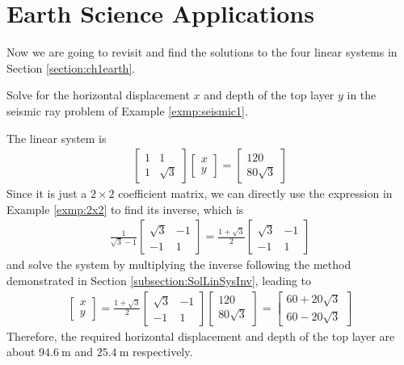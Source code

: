 \section{Earth Science Applications}
\label{section:ch3earth}
Now we are going to revisit and find the solutions to the four linear systems in Section \ref{section:ch1earth}.
\begin{exmp}
Solve for the horizontal displacement $x$ and depth of the top layer $y$ in the seismic ray problem of Example \ref{exmp:seismic1}.
\end{exmp}
\begin{solution}
The linear system is
\begin{align*}
\begin{bmatrix}
1 & 1 \\
1 & \sqrt{3}
\end{bmatrix}
\begin{bmatrix}
x \\
y
\end{bmatrix}
=
\begin{bmatrix}
120 \\
80\sqrt{3}
\end{bmatrix}
\end{align*}
Since it is just a $2 \times 2$ coefficient matrix, we can directly use the expression in Example \ref{exmp:2x2} to find its inverse, which is
\begin{align*}
\frac{1}{\sqrt{3}-1}
\begin{bmatrix}
\sqrt{3} & -1 \\
-1 & 1
\end{bmatrix}
=
\frac{1+\sqrt{3}}{2}
\begin{bmatrix}
\sqrt{3} & -1 \\
-1 & 1
\end{bmatrix}
\end{align*}
and solve the system by multiplying the inverse following the method demonstrated in Section \ref{subsection:SolLinSysInv}, leading to
\begin{align*}
\begin{bmatrix}
x \\
y
\end{bmatrix}
=
\frac{1+\sqrt{3}}{2}
\begin{bmatrix}
\sqrt{3} & -1 \\
-1 & 1
\end{bmatrix}
\begin{bmatrix}
120 \\
80\sqrt{3}
\end{bmatrix}
=
\begin{bmatrix}
60+20\sqrt{3}\\
60-20\sqrt{3}
\end{bmatrix}
\end{align*}
Therefore, the required horizontal displacement and depth of the top layer are about $\SI{94.6}{\m}$ and $\SI{25.4}{\m}$ respectively.
\end{solution}

